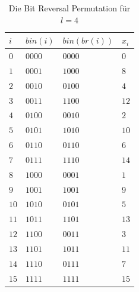 \documentclass[a4paper,12pt]{article}
\begin{document}
\begin{table}
	\begin{center}
		\begin{tabular}[c]{|l|l|l|l|}
			\hline
			$i$ & $\mathit{bin}\left(i\right)$ &$\mathit{bin}\left(\mathit{br}\left(i\right)\right)$  &$x_i$\\
			\hline
			$0$ & $0000$ &$0000$  &$0$\\
			\hline
			$1$ & $0001$ &$1000$  &$8$\\
			\hline
			$2$ & $0010$ &$0100$  &$4$\\
			\hline
			$3$ & $0011$ &$1100$  &$12$\\
			\hline
			$4$ & $0100$ &$0010$  &$2$\\
			\hline
			$5$ & $0101$ &$1010$  &$10$\\
			\hline
			$6$ & $0110$ &$0110$  &$6$\\
			\hline
			$7$ & $0111$ &$1110$  &$14$\\
			\hline
			$8$ & $1000$ &$0001$  &$1$\\
			\hline
			$9$ & $1001$ &$1001$  &$9$\\
			\hline
			$10$& $1010$ &$0101$  &$5$\\
			\hline
			$11$& $1011$ &$1101$  &$13$\\
			\hline
			$12$ &$1100$ &$0011$  &$3$\\
			\hline
			$13$ &$1101$ &$1011$  &$11$\\
			\hline
			$14$ &$1110$ &$0111$  &$7$\\
			\hline
			$15$ &$1111$ &$1111$  &$15$\\
			\hline
		\end{tabular}
		\caption{Die Bit Reversal Permutation für $l=4$} 
		\label{tab:bitReversal}
	\end{center}
\end{table}
\end{document}
